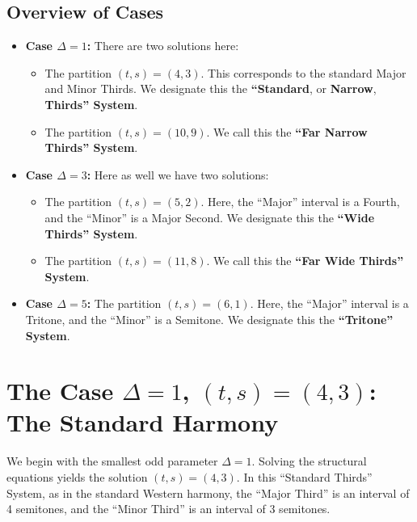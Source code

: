 \documentclass[12pt,letterpaper]{amsart}
\begin{document}
\subsection{Overview of Cases}
\begin{itemize}
\item \textbf{Case $\Delta=1$:} There are two solutions here:
  \begin{itemize}
\item The partition $(t,s) = (4,3)$. This corresponds to the standard Major and Minor Thirds. We designate this the \textbf{``Standard}, or \textbf{Narrow}, \textbf{Thirds'' System}.
\item The partition $(t,s)=(10,9)$.  We call this the \textbf{``Far Narrow Thirds'' System}.
  \end{itemize}
\item \textbf{Case $\Delta=3$:} Here as well we have two solutions:
\begin{itemize}
\item
  The partition $(t,s) = (5,2)$. Here, the ``Major'' interval is a Fourth, and the ``Minor'' is a Major Second. We designate this the \textbf{``Wide Thirds'' System}.
\item The partition $(t,s)=(11,8)$. We call this the \textbf{``Far Wide Thirds'' System}.
  \end{itemize}
\item \textbf{Case $\Delta=5$:} The partition $(t,s) = (6,1)$. Here, the ``Major'' interval is a Tritone, and the ``Minor'' is a Semitone. We designate this the \textbf{``Tritone'' System}.
\end{itemize}

\section{The Case $\Delta=1$, $(t,s)=(4,3)$: The Standard Harmony}

We begin with the smallest odd parameter $\Delta=1$. Solving the structural equations yields the solution $(t, s) = (4, 3)$.
In this ``Standard Thirds'' System, as in the standard Western harmony, the ``Major Third'' is an interval of 4 semitones, and the ``Minor Third'' is an interval of 3 semitones.
\end{document}
